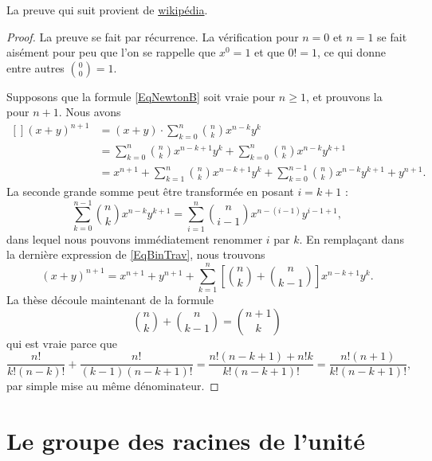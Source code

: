 La preuve qui suit provient de \href{http://fr.wikipedia.org/wiki/Formule_du_binôme_de_Newton}{wikipédia}.
\begin{proof}
    La preuve se fait par récurrence. La vérification pour $n=0$ et $n=1$ se fait aisément pour peu que l'on se rappelle que \( x^0=1\) et que \( 0!=1\), ce qui donne entre autres \( {0\choose 0}=1\).
    
    Supposons que la formule \eqref{EqNewtonB} soit vraie pour $n\geq1$, et prouvons la pour $n+1$. Nous avons
\begin{equation}        \label{EqBinTrav}
    \begin{aligned}[]
        (x+y)^{n+1} &=(x+y)\cdot  \sum_{k=0}^n{n\choose k}x^{n-k}y^k\\
                &= \sum_{k=0}^n{n\choose k}x^{n-k+1}y^k+\sum_{k=0}^n{n\choose k}x^{n-k}y^{k+1}\\
                &=x^{n+1}+ \sum_{k=1}^n{n\choose k}x^{n-k+1}y^k+\sum_{k=0}^{n-1}{n\choose k}x^{n-k}y^{k+1}+y^{n+1}.
    \end{aligned}
\end{equation}
La seconde grande somme peut être transformée en posant $i=k+1$ :
\begin{equation}
    \sum_{k=0}^{n-1}{n\choose k}x^{n-k}y^{k+1}  =\sum_{i=1}^n{n\choose i-1}x^{n-(i-1)}y^{i-1+1},
\end{equation}
dans lequel nous pouvons immédiatement renommer $i$ par $k$. En remplaçant dans la dernière expression de \eqref{EqBinTrav}, nous trouvons
\begin{equation}
    (x+y)^{n+1}=x^{n+1}+y^{n+1}+\sum_{k=1}^n\left[ {n\choose k}+{n\choose k-1} \right]x^{n-k+1}y^k.
\end{equation}
La thèse découle maintenant de la formule
\begin{equation}
    {n\choose k}+{n\choose k-1}={n+1\choose k}
\end{equation}
qui est vraie parce que
\begin{equation}
    \frac{ n! }{ k!(n-k)! }+\frac{ n! }{ (k-1)(n-k+1)! }=\frac{ n!(n-k+1)+n!k }{ k!(n-k+1)! }=\frac{ n!(n+1) }{  k!(n-k+1)!  },
\end{equation}
par simple mise au même dénominateur.
\end{proof}

\section{Le groupe des racines de l'unité}
\label{SecGJOLooWdMYVl}

